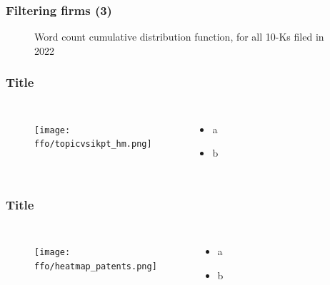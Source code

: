 \documentclass{beamer}
\newcommand{\ffo}{dicfullmc10thr10defnob40noa0_8_4t}
\begin{document}
\begin{frame}
\frametitle{Filtering firms (3)}
\label{min_words}
\begin{figure}
  \centering
  \hfill
  \caption{Word count cumulative distribution function, for all 10-Ks filed in 2022}
  \label{fig:cdf}
\end{figure}
\end{frame}

\begin{frame}
\frametitle{Title}
       \begin{columns}
             \begin{figure}[h!]
		  \centering
		  \texttt{[image: \\ffo/topicvsikpt\_hm.png]}
		  \centering
		  \captionsetup{font=scriptsize}
		  \label{fig:topicvsikpt_hm}
			\end{figure}
          \scriptsize
              \begin{itemize}
			  \item a
			  \item b
			\end{itemize}
	  \end{columns} 
\end{frame}

\begin{frame}
\frametitle{Title}
       \begin{columns}
             \begin{figure}[h!]
		  \centering
		  \texttt{[image: \\ffo/heatmap\_patents.png]}
		  \captionsetup{font=scriptsize}
		  \label{fig:heatmappatents}
			\end{figure}
          \scriptsize
              \begin{itemize}
			  \item a
			  \item b
			\end{itemize}
	  \end{columns} 
\end{frame}
\end{document}
